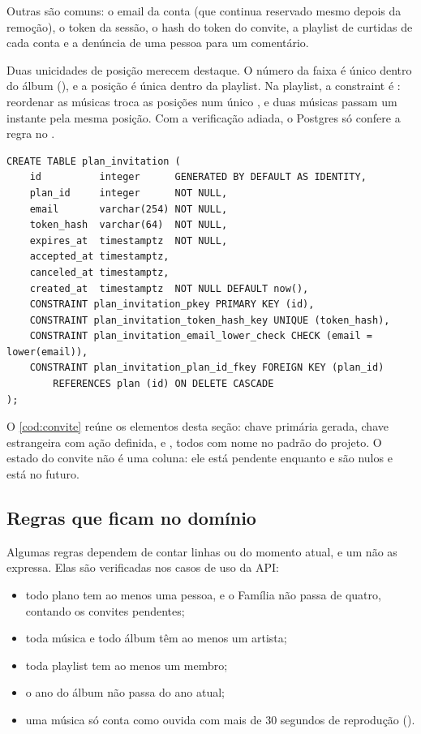 Outras são  comuns: o email da conta (que continua reservado
mesmo depois da remoção), o token da sessão, o hash do token do convite, a
playlist de curtidas de cada conta e a denúncia de uma pessoa para um
comentário.

Duas unicidades de posição merecem destaque. O número da faixa é único dentro
do álbum (), e a posição é única
dentro da playlist. Na playlist, a constraint é : reordenar as músicas troca as posições num único , e
duas músicas passam um instante pela mesma posição. Com a verificação adiada,
o Postgres só confere a regra no .

\begin{listing}[htbp]
  \caption{Tabela de convites do plano familiar
    ()}
  \label{cod:convite}
  \begin{verbatim}
CREATE TABLE plan_invitation (
    id          integer      GENERATED BY DEFAULT AS IDENTITY,
    plan_id     integer      NOT NULL,
    email       varchar(254) NOT NULL,
    token_hash  varchar(64)  NOT NULL,
    expires_at  timestamptz  NOT NULL,
    accepted_at timestamptz,
    canceled_at timestamptz,
    created_at  timestamptz  NOT NULL DEFAULT now(),
    CONSTRAINT plan_invitation_pkey PRIMARY KEY (id),
    CONSTRAINT plan_invitation_token_hash_key UNIQUE (token_hash),
    CONSTRAINT plan_invitation_email_lower_check CHECK (email = lower(email)),
    CONSTRAINT plan_invitation_plan_id_fkey FOREIGN KEY (plan_id)
        REFERENCES plan (id) ON DELETE CASCADE
);
  \end{verbatim}
\end{listing}

O \cref{cod:convite} reúne os elementos desta seção: chave primária gerada,
chave estrangeira com ação definida,  e , todos com
nome no padrão do projeto. O estado do convite não é uma coluna: ele está
pendente enquanto  e  são nulos e
 está no futuro.

\FloatBarrier
\subsection{Regras que ficam no domínio}

Algumas regras dependem de contar linhas ou do momento atual, e um
 não as expressa. Elas são verificadas nos casos de uso da API:

\begin{itemize}
  \item todo plano tem ao menos uma pessoa, e o Família não passa de quatro,
    contando os convites pendentes;
  \item toda música e todo álbum têm ao menos um artista;
  \item toda playlist tem ao menos um membro;
  \item o ano do álbum não passa do ano atual;
  \item uma música só conta como ouvida com mais de 30 segundos de reprodução
    ().
\end{itemize}
